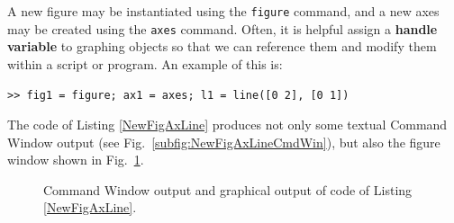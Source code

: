A new figure may be instantiated using the \texttt{figure} command, and a new axes may be created using the \texttt{axes} command. Often, it is helpful assign a \textbf{handle variable} to graphing objects so that we can reference them and modify them within a script or program. An example of this is:
\begin{lstlisting}[style=Matlab-editor,label=NewFigAxLine,caption={A Command Window input to create a line with handle \texttt{l1} within \texttt{axes} object \texttt{ax1} within \texttt{figure} object \texttt{fig1}.}]
>> fig1 = figure; ax1 = axes; l1 = line([0 2], [0 1])
\end{lstlisting}
The code of Listing \ref{NewFigAxLine} produces not only some textual Command Window output (see Fig.\ \ref{subfig:NewFigAxLineCmdWin}), but also the figure window shown in Fig.\ \ref{fig:NewFigAxLine}.
\begin{figure}[htbp] %
   \centering
   \caption{Command Window output and graphical output of code of Listing \ref{NewFigAxLine}.}
   \label{fig:NewFigAxLine}
\end{figure}
